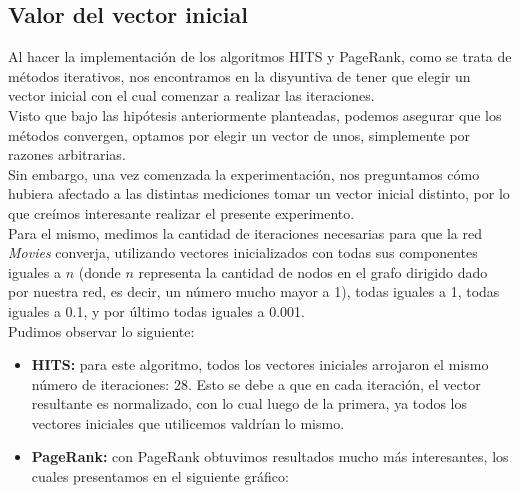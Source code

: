 \documentclass[a4paper]{article}
\begin{document}
\newpage

\subsection{Valor del vector inicial}

Al hacer la implementación de los algoritmos HITS y PageRank, como se trata de métodos iterativos, nos encontramos en la disyuntiva de tener que elegir un vector inicial con el cual comenzar a realizar las iteraciones.\\
\indent Visto que bajo las hipótesis anteriormente planteadas, podemos asegurar que los métodos convergen, optamos por elegir un vector de unos, simplemente por razones arbitrarias.\\

Sin embargo, una vez comenzada la experimentación, nos preguntamos cómo hubiera afectado a las distintas mediciones tomar un vector inicial distinto, por lo que creímos interesante realizar el presente experimento.\\
Para el mismo, medimos la cantidad de iteraciones necesarias para que la red \textit{Movies} converja, utilizando vectores inicializados con todas sus componentes iguales a $n$ (donde $n$ representa la cantidad de nodos en el grafo dirigido dado por nuestra red, es decir, un número mucho mayor a 1), todas iguales a 1, todas iguales a 0.1, y por último todas iguales a 0.001.\\

Pudimos observar lo siguiente:

\begin{itemize}
\item \textbf{HITS: } para este algoritmo, todos los vectores iniciales arrojaron el mismo número de iteraciones: 28. \newline
Esto se debe a que en cada iteración, el vector resultante es normalizado, con lo cual luego de la primera, ya todos los vectores iniciales que utilicemos valdrían lo mismo.
\item \textbf{PageRank: } con PageRank obtuvimos resultados mucho más interesantes, los cuales presentamos en el siguiente gráfico:
\end{itemize}
\end{document}
